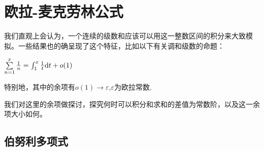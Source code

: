 \documentclass[12pt, a4paper, oneside, UTF8]{ctexbook}
\begin{document}
	\section{欧拉-麦克劳林公式}
		我们直观上会认为，一个连续的级数和应该可以用这一整数区间的积分来大致模拟。一些结果也的确呈现了这个特征，比如以下有关调和级数的命题：
		
		$\sum\limits_{n=1}^{x} \frac{1}{n} = \int_{1}^{x} \frac{1}{t}\mathrm{d} t +o(1)$
		
		特别地，其中的余项有$o(1)\to\varepsilon$,$\varepsilon$为欧拉常数.
		
		我们对这里的余项做探讨，探究何时可以积分和求和的差值为常数阶，以及这一余项大小如何。
		\subsection{伯努利多项式}
\end{document}
